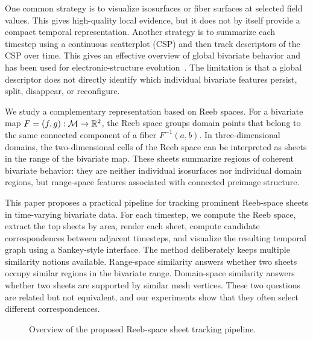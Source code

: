 One common strategy is to visualize isosurfaces or fiber surfaces at selected
field values. This gives high-quality local evidence, but it does not by itself
provide a compact temporal representation. Another strategy is to summarize each
timestep using a continuous scatterplot (CSP) and then track descriptors of the
CSP over time. This gives an effective overview of global bivariate behavior
and has been used for electronic-structure evolution~\cite{sharma2025csp}. The
limitation is that a global descriptor does not directly identify which
individual bivariate features persist, split, disappear, or reconfigure.

We study a complementary representation based on Reeb spaces. For a bivariate
map \(F=(f,g):\mathcal{M}\rightarrow\mathbb{R}^2\), the Reeb space groups domain points
that belong to the same connected component of a fiber \(F^{-1}(a,b)\). In
three-dimensional domains, the two-dimensional cells of the Reeb space can be
interpreted as sheets in the range of the bivariate map. These sheets summarize
regions of coherent bivariate behavior: they are neither individual isosurfaces
nor individual domain regions, but range-space features associated with
connected preimage structure.

This paper proposes a practical pipeline for tracking prominent Reeb-space
sheets in time-varying bivariate data. For each timestep, we compute the Reeb
space, extract the top sheets by area, render each sheet, compute candidate
correspondences between adjacent timesteps, and visualize the resulting temporal
graph using a Sankey-style interface. The method deliberately keeps multiple
similarity notions available. Range-space similarity answers whether two sheets
occupy similar regions in the bivariate range. Domain-space similarity answers
whether two sheets are supported by similar mesh vertices. These two questions
are related but not equivalent, and our experiments show that they often select
different correspondences.

\begin{figure}[t]
  \caption{Overview of the proposed Reeb-space sheet tracking pipeline.}
  \label{fig:pipeline}
\end{figure}

